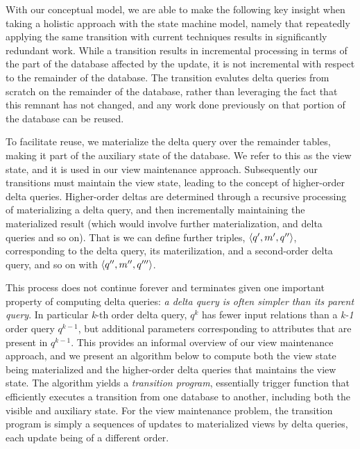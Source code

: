 With our conceptual model, we are able to make the
following key insight when taking a holistic approach with the state machine
model, namely that repeatedly applying the same transition with current
techniques results in significantly redundant work. While a transition results
in incremental processing in terms of the part of the database affected by the
update, it is not incremental with respect to the remainder of the database. The
transition evalutes delta queries from scratch on the remainder of the database,
rather than leveraging the fact that this remnant has not changed, and any work
done previously on that portion of the database can be reused.

To facilitate reuse, we materialize the delta query over the remainder tables,
making it part of the auxiliary state of the database. We refer to this as the
view state, and it is used in our view maintenance approach. Subsequently our
transitions must maintain the view state, leading to the concept of higher-order
delta queries. Higher-order deltas are determined through a recursive processing
of materializing a delta query, and then incrementally maintaining the
materialized result (which would involve further materialization, and delta
queries and so on). That is we can define further triples,
${\langle q', m', q''\rangle}$, corresponding to the delta query, its materilization,
and a second-order delta query, and so on with ${\langle q'',m'',q'''\rangle}$.

This process does not continue forever and terminates given one important
property of computing delta queries: \textit{a delta query is often simpler than
its parent query}. In particular \textit{k}-th order delta query, $q^k$ has
fewer input relations than a \textit{k-1} order query $q^{k-1}$, but additional
parameters corresponding to attributes that are present in $q^{k-1}$. This
provides an informal overview of our view maintenance approach, and we present
an algorithm below to compute both the view state being materialized and the
higher-order delta queries that maintains the view state. The algorithm yields a
\textit{transition program}, essentially trigger function that efficiently
executes a transition from one database to another, including both the visible
and auxiliary state. For the view maintenance problem, the transition program is
simply a sequences of updates to materialized views by delta queries, each
update being of a different order.

